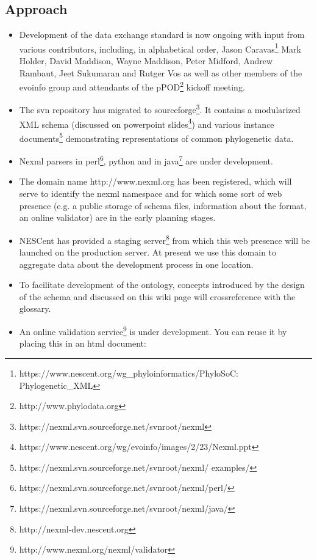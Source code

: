 \documentclass{article}
\begin{document}
\subsection{Approach}

\begin{itemize}

\item Development of the data exchange standard is now ongoing with
input from various contributors, including, in alphabetical order, Jason
Caravas\footnote{https://www.nescent.org/wg\_phyloinformatics/PhyloSoC:
Phylogenetic\_XML} Mark  Holder, David Maddison, Wayne Maddison, Peter
Midford, Andrew Rambaut, Jeet Sukumaran and Rutger Vos as well as other
members of the evoinfo group and attendants of the
pPOD\footnote{http://www.phylodata.org} kickoff meeting.

\item The svn repository has migrated to
sourceforge\footnote{https://nexml.svn.sourceforge.net/svnroot/nexml}.
It contains a modularized XML schema (discussed on powerpoint
slides\footnote{https://www.nescent.org/wg/evoinfo/images/2/23/Nexml.ppt
}) and various instance
documents\footnote{https://nexml.svn.sourceforge.net/svnroot/nexml/
examples/} demonstrating representations of common phylogenetic data.

\item Nexml parsers in
perl\footnote{https://nexml.svn.sourceforge.net/svnroot/nexml/perl/},
python and in
java\footnote{https://nexml.svn.sourceforge.net/svnroot/nexml/java/} are
under development.

\item The domain name http://www.nexml.org has been registered, which
will serve to identify the nexml namespace and for which some sort of
web presence (e.g. a public storage of schema files, information about
the format, an online validator) are in the early planning stages.

\item NESCent has provided a staging
server\footnote{http://nexml-dev.nescent.org} from which this web
presence will be launched on the production server. At present we use
this domain to aggregate data about the development process in one
location.

\item To facilitate development of the ontology, concepts introduced by
the design of the schema and discussed on this wiki page will
crossreference with the glossary.

\item An online validation
service\footnote{http://www.nexml.org/nexml/validator} is under
development. You can reuse it by placing this in an html document:


\end{itemize}
\end{document}

